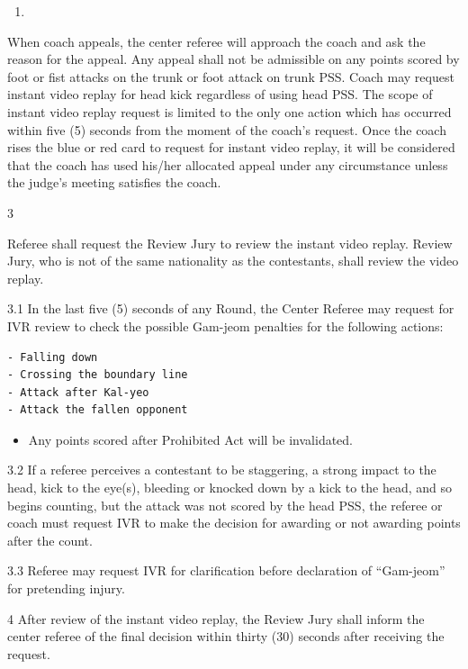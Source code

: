 \documentclass[draft]{report}
\providecommand{\tightlist}{%
  \setlength{\itemsep}{0pt}\setlength{\parskip}{0pt}}
\renewcommand{\labelenumi}{\arabic{enumi}}
\begin{document}
\begin{enumerate}
\def\labelenumi{\arabic{enumi}.}
\setcounter{enumi}{1}
\tightlist
\item
\end{enumerate}

When coach appeals, the center referee will approach the coach and ask
the reason for the appeal. Any appeal shall not be admissible on any
points scored by foot or fist attacks on the trunk or foot attack on
trunk PSS. Coach may request instant video replay for head kick
regardless of using head PSS. The scope of instant video replay request
is limited to the only one action which has occurred within five (5)
seconds from the moment of the coach's request. Once the coach rises the
blue or red card to request for instant video replay, it will be
considered that the coach has used his/her allocated appeal under any
circumstance unless the judge's meeting satisfies the coach.

3

Referee shall request the Review Jury to review the instant video
replay. Review Jury, who is not of the same nationality as the
contestants, shall review the video replay.

3.1 In the last five (5) seconds of any Round, the Center Referee may
request for IVR review to check the possible Gam-jeom penalties for the
following actions:

\begin{verbatim}
- Falling down
- Crossing the boundary line
- Attack after Kal-yeo
- Attack the fallen opponent
\end{verbatim}

\begin{itemize}
\tightlist
\item
  Any points scored after Prohibited Act will be invalidated.
\end{itemize}

3.2 If a referee perceives a contestant to be staggering, a strong
impact to the head, kick to the eye(s), bleeding or knocked down by a
kick to the head, and so begins counting, but the attack was not scored
by the head PSS, the referee or coach must request IVR to make the
decision for awarding or not awarding points after the count.

3.3 Referee may request IVR for clarification before declaration of
``Gam-jeom'' for pretending injury.

4 After review of the instant video replay, the Review Jury shall inform
the center referee of the final decision within thirty (30) seconds
after receiving the request.
\end{document}

